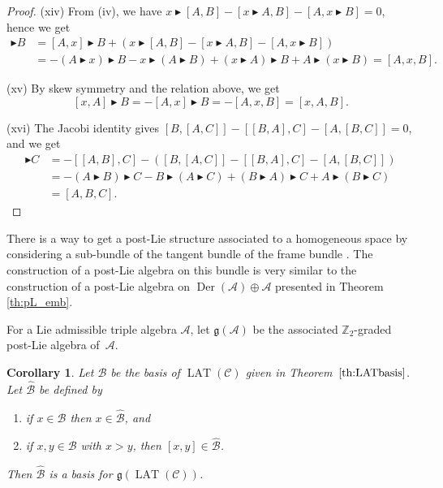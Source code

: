 \documentclass[10pt,a4paper]{amsart}
\newcommand{\Der}{\operatorname{Der}}
\newcommand*{\LAT}{\operatorname{LAT}}
\numberwithin{equation}{section}
\newtheorem{Corollary}[Theorem]{Corollary}
\begin{document}
\begin{proof}
(xiv) From (iv), we have $x \blacktriangleright [A,B] - [x \blacktriangleright A,B] - [A, x\blacktriangleright B] = 0$, hence we get
 \begin{align*}
 [A,x] \blacktriangleright B & = [A, x] \blacktriangleright B + ( x \blacktriangleright [A,B] - [x \blacktriangleright A,B] - [A, x\blacktriangleright B] ) \\
 & = - (A \blacktriangleright x) \blacktriangleright B - x \blacktriangleright (A \blacktriangleright B) + (x \blacktriangleright A) \blacktriangleright B + A \blacktriangleright (x \blacktriangleright B )
 = [A,x,B].
 \end{align*}

(xv) By skew symmetry and the relation above, we get
 \[
 [x,A] \blacktriangleright B = -[A,x] \blacktriangleright B = -[A,x,B] = [x,A,B].
 \]

(xvi) The Jacobi identity gives $[B,[A,C]] - [[B,A],C] - [A,[B,C]]=0$, and we get
 \begin{align*}
 [A,B] \blacktriangleright C &{}= -[[A,B],C] - ( [B,[A,C]] - [[B,A],C] - [A,[B,C]] ) \\
 &{}= - (A\blacktriangleright B ) \blacktriangleright C - B \blacktriangleright ( A \blacktriangleright C) + (B \blacktriangleright A ) \blacktriangleright C + A \blacktriangleright (B \blacktriangleright C) \\
 &{}= [A,B,C].
\tag*{\qed}
\end{align*}
\renewcommand{\qed}{}
\end{proof}

\begin{Remark}
 There is a way to get a post-Lie structure associated to a homogeneous space by considering a sub-bundle of the tangent bundle of the frame bundle \cite{grong_MK_S_2023}. The construction of a post-Lie algebra on this bundle is very similar to the construction of a post-Lie algebra on $\Der(\mathcal{A}) \oplus \mathcal{A}$ presented in Theorem \ref{th:pL_emb}.
\end{Remark}

For a Lie admissible triple algebra $\mathcal{A}$, let $\mathfrak{g}(\mathcal{A})$ be the associated $\mathbb{Z}_2$-graded post-Lie algebra of~$\mathcal{A}$.

\begin{Corollary}
 Let $\mathcal{B}$ be the basis of $\LAT(\mathcal{C})$ given in Theorem~$\ref{th:LATbasis}$. Let $\hat{\mathcal{B}}$ be defined by
 \begin{enumerate}\itemsep=0pt
 \item[$(i)$] if $x\in \mathcal{B}$ then $x \in \hat{\mathcal{B}}$, and
 \item[$(ii)$] if $x,y \in \mathcal{B}$ with $x>y$, then $[x,y] \in \hat{\mathcal{B}}$.
 \end{enumerate}
 Then $\hat{\mathcal{B}}$ is a basis for $\mathfrak{g}(\LAT(\mathcal{C}))$.
\end{Corollary}
\end{document}

